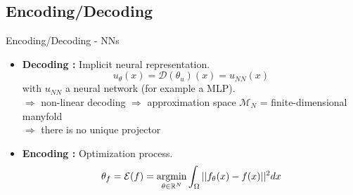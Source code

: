 \subsection{Encoding/Decoding}

\begin{frame}{Encoding/Decoding - NNs}
	\begin{itemize}[\textbullet]
		\item \textbf{Decoding :} Implicit neural representation.
		\begin{equation*}
			u_\theta(x)=\mathcal{D}(\theta_u)(x)=u_{NN}(x)
		\end{equation*}
		with $u_{NN}$ a neural network (for example a MLP). \\
		$\Rightarrow$ non-linear decoding $\Rightarrow$ approximation space $\mathcal{M}_N$ = finite-dimensional manyfold \\
		$\Rightarrow$ there is no unique projector
		\item \textbf{Encoding :} Optimization process.
		\begin{equation*}
			\displaystyle \theta_f=\mathcal{E}(f)=\operatorname*{argmin}_{\theta\in\mathbb{R}^N}\int_\Omega ||f_\theta(x)-f(x)||^2 dx
		\end{equation*}
	\end{itemize}
\end{frame}

